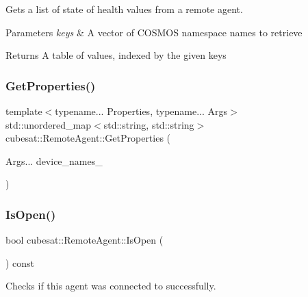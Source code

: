 Gets a list of state of health values from a remote agent. 


\begin{DoxyParams}{Parameters}
{\em keys} & A vector of C\+O\+S\+M\+OS namespace names to retrieve \\
\hline
\end{DoxyParams}
\begin{DoxyReturn}{Returns}
A table of values, indexed by the given keys 
\end{DoxyReturn}
\mbox{\label{classcubesat_1_1RemoteAgent_a08ff2ce8cd3114533ea51959f3f8c9ef}} 
\subsubsection{\texorpdfstring{Get\+Properties()}{GetProperties()}}
{\footnotesize\ttfamily template$<$typename... Properties, typename... Args$>$ \\
std\+::unordered\+\_\+map$<$std\+::string, std\+::string$>$ cubesat\+::\+Remote\+Agent\+::\+Get\+Properties (\begin{DoxyParamCaption}\item[{Args...}]{device\+\_\+names\+\_\+ }\end{DoxyParamCaption})\hspace{0.3cm}{\ttfamily [inline]}}

\mbox{\label{classcubesat_1_1RemoteAgent_a149ba4f966974d78c265a18921057a6f}} 
\subsubsection{\texorpdfstring{Is\+Open()}{IsOpen()}}
{\footnotesize\ttfamily bool cubesat\+::\+Remote\+Agent\+::\+Is\+Open (\begin{DoxyParamCaption}{ }\end{DoxyParamCaption}) const\hspace{0.3cm}{\ttfamily [inline]}}



Checks if this agent was connected to successfully. 

